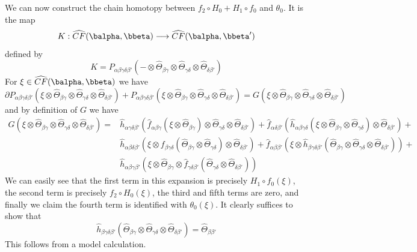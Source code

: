 We can now construct the chain homotopy between $f_2 \circ H_0 + H_1 \circ f_0$ and $\theta_0$. It is the map
\[ K : \widehat{CF}(\balpha,\bbeta) \longrightarrow \widehat{CF}(\balpha,\bbeta') \]
defined by
\[ K = P_{\alpha\beta\gamma\delta\beta'}(- \otimes \widehat{\Theta}_{\beta\gamma} \otimes \widehat{\Theta}_{\gamma\delta} \otimes \widehat{\Theta}_{\delta\beta'}) \]
For $\xi \in \widehat{CF}(\balpha,\bbeta)$ we have
\[ \partial P_{\alpha\beta\gamma\delta\beta'}(\xi \otimes \widehat{\Theta}_{\beta\gamma} \otimes \widehat{\Theta}_{\gamma\delta} \otimes \widehat{\Theta}_{\delta\beta'}) + P_{\alpha\beta\gamma\delta\beta'}(\xi \otimes \widehat{\Theta}_{\beta\gamma} \otimes \widehat{\Theta}_{\gamma\delta} \otimes \widehat{\Theta}_{\delta\beta'}) = G(\xi \otimes \widehat{\Theta}_{\beta\gamma} \otimes \widehat{\Theta}_{\gamma\delta} \otimes \widehat{\Theta}_{\delta\beta'}) \]
and by definition of $G$ we have
\begin{align*}
G(\xi \otimes \widehat{\Theta}_{\beta\gamma} \otimes \widehat{\Theta}_{\gamma\delta} \otimes \widehat{\Theta}_{\delta\beta'}) =& \widehat{h}_{\alpha\gamma\delta\beta'}(\widehat{f}_{\alpha\beta\gamma}(\xi \otimes \widehat{\Theta}_{\beta\gamma}) \otimes \widehat{\Theta}_{\gamma\delta} \otimes \widehat{\Theta}_{\delta\beta'}) + \widehat{f}_{\alpha\delta\beta'}(\widehat{h}_{\alpha\beta\gamma\delta}(\xi \otimes \widehat{\Theta}_{\beta\gamma} \otimes \widehat{\Theta}_{\gamma\delta}) \otimes \widehat{\Theta}_{\delta\beta'}) +  \\
	& \widehat{h}_{\alpha\beta\delta\beta'}(\xi \otimes f_{\beta\gamma\delta}(\widehat{\Theta}_{\beta\gamma} \otimes \widehat{\Theta}_{\gamma\delta}) \otimes \widehat{\Theta}_{\delta\beta'}) + \widehat{f}_{\alpha\beta\beta'}(\xi \otimes \widehat{h}_{\beta\gamma\delta\beta'}(\widehat{\Theta}_{\beta\gamma}\otimes\widehat{\Theta}_{\gamma\delta}\otimes\widehat{\Theta}_{\delta\beta'})) + \\
	& \widehat{h}_{\alpha\beta\gamma\beta'}(\xi \otimes \widehat{\Theta}_{\beta\gamma} \otimes \widehat{f}_{\gamma\delta\beta'}(\widehat{\Theta}_{\gamma\delta}\otimes\widehat{\Theta}_{\delta\beta'}))
\end{align*}
We can easily see that the first term in this expansion is precisely $H_1 \circ f_0(\xi)$, the second term is precisely $f_2 \circ H_0(\xi)$, the third and fifth terms are zero, and finally we claim the fourth term is identified with $\theta_0(\xi)$. It clearly suffices to show that 
\[ \widehat{h}_{\beta\gamma\delta\beta'}(\widehat{\Theta}_{\beta\gamma} \otimes \widehat{\Theta}_{\gamma\delta} \otimes \widehat{\Theta}_{\delta\beta'}) = \widehat{\Theta}_{\beta\beta'} \]
This follows from a model calculation.


